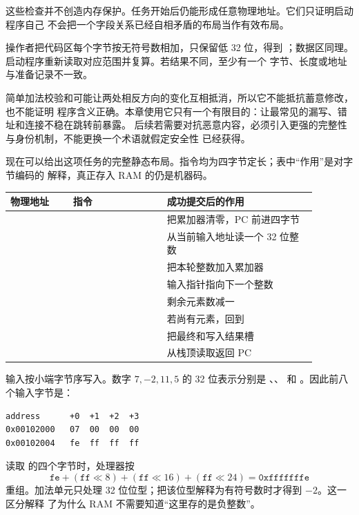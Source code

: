 这些检查并不创造内存保护。任务开始后仍能形成任意物理地址。它们只证明启动程序自己
不会把一个字段关系已经自相矛盾的布局当作有效布局。


操作者把代码区每个字节按无符号数相加，只保留低 32 位，得到
；数据区同理。启动程序重新读取对应范围并复算。若结果不同，至少有一个
字节、长度或地址与准备记录不一致。

简单加法校验和可能让两处相反方向的变化互相抵消，所以它不能抵抗蓄意修改，也不能证明
程序含义正确。本章使用它只有一个有限目的：让最常见的漏写、错址和连接不稳在跳转前暴露。
后续若需要对抗恶意内容，必须引入更强的完整性与身份机制，不能更换一个术语就假定安全性
已经获得。


现在可以给出这项任务的完整静态布局。指令均为四字节定长；表中“作用”是对字节编码的
解释，真正存入 RAM 的仍是机器码。

\begin{longtable}{|L{0.18\linewidth}|L{0.27\linewidth}|L{0.43\linewidth}|}
\hline
{}
物理地址 & 指令 & 成功提交后的作用 \\ \hline
{} &  & 把累加器清零，PC 前进四字节 \\ \hline
{} &  & 从当前输入地址读一个 32 位整数 \\ \hline
{} &  & 把本轮整数加入累加器 \\ \hline
{} &  & 输入指针指向下一个整数 \\ \hline
{} &  & 剩余元素数减一 \\ \hline
{} &  & 若尚有元素，回到  \\ \hline
{} &  & 把最终和写入结果槽 \\ \hline
{} &  & 从栈顶读取返回 PC \\ \hline
\end{longtable}

输入按小端字节序写入。数字 \(7,-2,11,5\) 的 32 位表示分别是
、、 和
。因此前八个输入字节是：

\begin{lstlisting}
address      +0  +1  +2  +3
0x00102000   07  00  00  00
0x00102004   fe  ff  ff  ff
\end{lstlisting}

读取  的四个字节时，处理器按
\[
\texttt{fe}+(\texttt{ff}\ll 8)+(\texttt{ff}\ll16)+(\texttt{ff}\ll24)
=\texttt{0xfffffffe}
\]
重组。加法单元只处理 32 位位型；把该位型解释为有符号数时才得到 \(-2\)。这一区分解释
了为什么 RAM 不需要知道“这里存的是负整数”。


